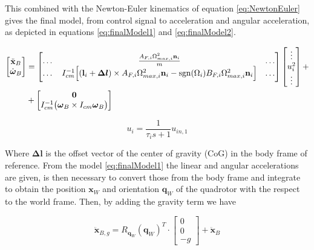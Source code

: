 \noindent This combined with the Newton-Euler kinematics of equation \eqref{eq:NewtonEuler} gives the final model, from control signal to acceleration and angular acceleration, as depicted in equations \eqref{eq:finalModel1} and \eqref{eq:finalModel2}.

\begin{equation}
	\begin{split}
		\begin{bmatrix}
			\ddot{\mathbf{x}}_B \\
			\dot{\boldsymbol{\omega}}_B
		\end{bmatrix}
		&=
		\begin{bmatrix}
			\dots & \frac{A_{F,i}\Omega_{max,i}^2\mathbf{n}_i}{m} & \dots \\
			\dots & I_{cm}^{-1}\Big[ (\mathbf{l}_i+\boldsymbol{\Delta l})\times A_{F,i}\Omega^2_{max,i}\mathbf{n}_i-\operatorname*{sgn}(\Omega_i)B_{F,i}\Omega_{max,i}^2\mathbf{n}_i\Big] & \dots
		\end{bmatrix}
		\begin{bmatrix}
			\vdots \\
			u_i^2 \\
			\vdots
		\end{bmatrix}
		+ \\
		&+
		\begin{bmatrix}
			\mathbf{0} \\
			I_{cm}^{-1}\bigl(\boldsymbol{\omega}_B \times I_{cm} \boldsymbol{\omega}_B \bigl)
		\end{bmatrix} \\
	\end{split}
	\label{eq:finalModel1}
\end{equation}

\begin{equation}
	u_i = \frac{1}{\tau_is+1}u_{in,1}
	\label{eq:finalModel2}
\end{equation}

\noindent Where $\boldsymbol{\Delta l}$ is the offset vector of the center of gravity (CoG) in the body frame of reference. From the model \eqref{eq:finalModel1} the linear and angular accelerations are given, is then necessary to convert those from the body frame and integrate to obtain the position $\mathbf{x}_W$ and orientation $\mathbf{q}_W$ of the quadrotor with the respect to the world frame. Then, by adding the gravity term we have

\begin{equation}
	\ddot{\mathbf{x}}_{B, g} = R_{\mathbf{q}_W}(\mathbf{q}_W)^T \cdot
	\begin{bmatrix}
		0 \\
		0 \\
		-g 
	\end{bmatrix}
	+ \ddot{\mathbf{x}}_B
	\label{eq:gravity}
\end{equation}

